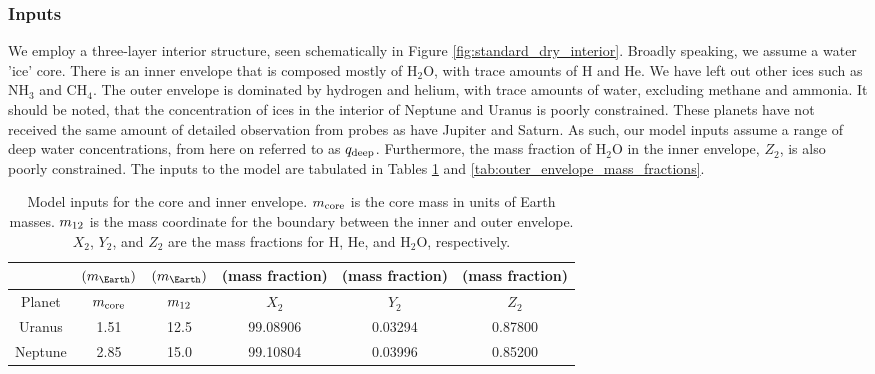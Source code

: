 \documentclass[11pt]{ucscthesisbs}
\begin{document}
\subsubsection{Inputs}
We employ a three-layer interior structure, seen schematically in Figure \ref{fig:standard_dry_interior}. Broadly speaking, we assume a water 'ice' core. There is an inner envelope that is composed mostly of H$_{2}$O, with trace amounts of H and He. We have left out other ices such as NH$_{3}$ and CH$_{4}$. The outer envelope is dominated by hydrogen and helium, with trace amounts of water, excluding methane and ammonia. It should be noted, that the concentration of ices in the interior of Neptune and Uranus is poorly constrained. These planets have not received the same amount of detailed observation from probes as have Jupiter and Saturn. As such, our model inputs assume a range of deep water concentrations, from here on referred to as $q_{\rm deep}$. Furthermore, the mass fraction of H$_{2}$O in the inner envelope, $Z_{2}$, is also poorly constrained. The inputs to the model are tabulated in Tables \ref{tab:core_mass_and_inner_envelope_mass_fractions} and \ref{tab:outer_envelope_mass_fractions}.



\begin{table}[]
\centering
\begin{tabular}{cccccc}
                              & $(m_{\Earth})$                      & $(m_{\Earth})$                    & (mass fraction)               & (mass fraction)              & (mass fraction)              \\ \hline
\multicolumn{1}{|c|}{Planet}  & \multicolumn{1}{c|}{$m_{\rm core}$} & \multicolumn{1}{c|}{$m_{\rm 12}$} & \multicolumn{1}{c|}{$X_{2}$}  & \multicolumn{1}{c|}{$Y_{2}$} & \multicolumn{1}{c|}{$Z_{2}$} \\ \hline
\multicolumn{1}{|c|}{Uranus}  & \multicolumn{1}{c|}{1.51}           & \multicolumn{1}{c|}{12.5}         & \multicolumn{1}{c|}{99.08906} & \multicolumn{1}{c|}{0.03294} & \multicolumn{1}{c|}{0.87800} \\ \hline
\multicolumn{1}{|c|}{Neptune} & \multicolumn{1}{c|}{2.85}           & \multicolumn{1}{c|}{15.0}         & \multicolumn{1}{c|}{99.10804} & \multicolumn{1}{c|}{0.03996} & \multicolumn{1}{c|}{0.85200} \\ \hline
\end{tabular}
\caption{Model inputs for the core and inner envelope. $m_{\rm core}$ is the core mass in units of Earth masses. $m_{\rm 12}$ is the mass coordinate for the boundary between the inner and outer envelope. $X_{2}$, $Y_{2}$, and $Z_{2}$ are the mass fractions for H, He, and H$_{2}$O, respectively.}
\label{tab:core_mass_and_inner_envelope_mass_fractions}
\end{table}
\end{document}
